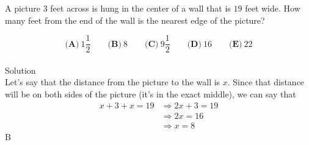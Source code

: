 

A picture $ 3$ feet across is hung in the center of a wall that is $ 19$ feet wide. How many feet from the end of the wall is the nearest edge of the picture?

\[ \textbf{(A)}\ 1 \frac{1}{2} \qquad
\textbf{(B)}\ 8 \qquad
\textbf{(C)}\ 9 \frac{1}{2} \qquad
\textbf{(D)}\ 16 \qquad
\textbf{(E)}\ 22
\]
\\
Solution
\\
Let's say that the distance from the picture to the wall is $x$. Since that distance will be on both sides of the picture (it's in the exact middle), we can say that \begin{align*} x + 3 + x = 19 &\Rightarrow 2x+3=19 \\ &\Rightarrow 2x=16 \\ &\Rightarrow x=8 \\ \end{align*}
$\boxed{\text{B}}$